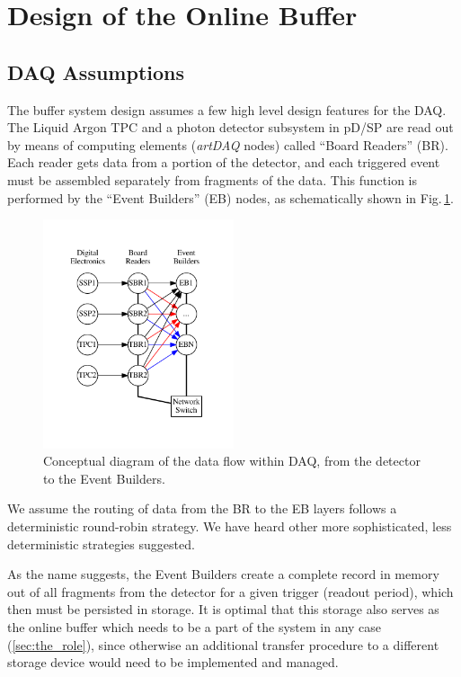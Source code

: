 \documentclass[pdftex,12pt,letter]{article}
\newcommand{\pdsp}{pD/SP\xspace}
\begin{document}
\section{Design of the Online Buffer}
\subsection{DAQ Assumptions}
The buffer system design assumes a few high level design features for the DAQ.
The Liquid Argon TPC  and a photon detector subsystem in \pdsp are read out by means of
computing elements (\textit{artDAQ} nodes) called ``Board Readers'' (BR). 
Each reader gets data from a portion of the detector,
and each triggered event must be assembled separately from fragments of the data. This function
is performed by the ``Event Builders'' (EB) nodes, as schematically shown in Fig.\,\ref{fig:upstream}.

\begin{figure}[tbh]
  \centering
  \includegraphics[width=0.5\textwidth]{figures/upstream.pdf}
  \caption{Conceptual diagram of the data flow within DAQ, from the detector to the Event Builders.}
  \label{fig:upstream}
\end{figure}

We assume the routing of data from the BR to the EB layers follows a deterministic round-robin strategy.
We have heard other more sophisticated, less deterministic strategies suggested.


As the name suggests,
the Event Builders create a complete record in memory out of all fragments from the detector for a given trigger (readout period),
which then must be persisted in storage. It is optimal that  this storage also serves as the online buffer 
 which needs to be a part of the system in any case (\ref{sec:the_role}), since otherwise an additional transfer procedure
to a different storage device would need to be implemented and managed.
\end{document}
